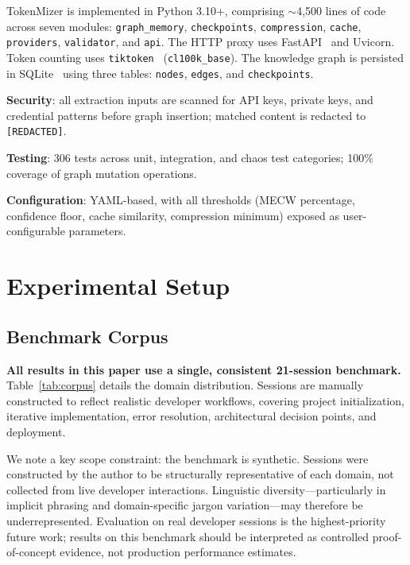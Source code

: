 \documentclass[journal]{IEEEtran}
\begin{document}
TokenMizer is implemented in Python 3.10+, comprising
$\sim$4{,}500 lines of code across seven modules:
\texttt{graph\_memory}, \texttt{checkpoints},
\texttt{compression}, \texttt{cache}, \texttt{providers},
\texttt{validator}, and \texttt{api}.
The HTTP proxy uses FastAPI~\cite{fastapi} and Uvicorn.
Token counting uses \texttt{tiktoken}~\cite{tiktoken}
(\texttt{cl100k\_base}).
The knowledge graph is persisted in SQLite~\cite{sqlite}
using three tables: \texttt{nodes}, \texttt{edges}, and
\texttt{checkpoints}.

\textbf{Security}: all extraction inputs are scanned for
API keys, private keys, and credential patterns before graph
insertion; matched content is redacted to
\texttt{[REDACTED]}.

\textbf{Testing}: 306 tests across unit, integration, and
chaos test categories; 100\% coverage of graph mutation
operations.

\textbf{Configuration}: YAML-based, with all thresholds
(MECW percentage, confidence floor, cache similarity,
compression minimum) exposed as user-configurable parameters.

\section{Experimental Setup}
\label{sec:experiments}

\subsection{Benchmark Corpus}

\textbf{All results in this paper use a single, consistent
21-session benchmark.}
Table~\ref{tab:corpus} details the domain distribution.
Sessions are manually constructed to reflect realistic
developer workflows, covering project initialization,
iterative implementation, error resolution, architectural
decision points, and deployment.

We note a key scope constraint: the benchmark is synthetic.
Sessions were constructed by the author to be structurally
representative of each domain, not collected from live
developer interactions.
Linguistic diversity---particularly in implicit phrasing and
domain-specific jargon variation---may therefore be
underrepresented.
Evaluation on real developer sessions is the highest-priority
future work; results on this benchmark should be interpreted
as controlled proof-of-concept evidence, not production
performance estimates.
\end{document}
